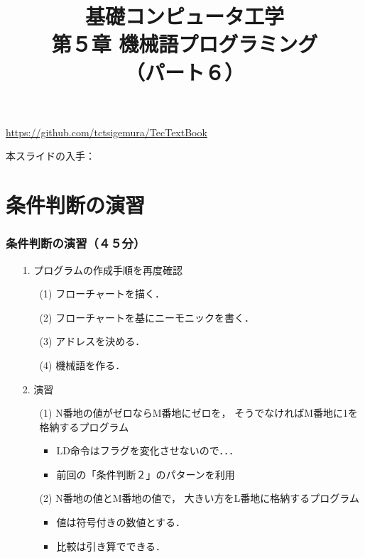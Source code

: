 \documentclass[handout]{beamer}        %
\begin{document}
\title{基礎コンピュータ工学\\第５章 機械語プログラミング\\（パート６）}
\date{}

\begin{frame}
  \titlepage
  \centerline{\url{https://github.com/tctsigemura/TecTextBook}}
  \vfill
  \centerline{本スライドの入手：
    }
\end{frame}


\section{条件判断の演習}
\begin{frame}
  \frametitle{条件判断の演習（４５分）}
  \begin{enumerate}
  \item[1.] プログラムの作成手順を再度確認
    \begin{enumerate}
    \item[(1)] フローチャートを描く．
    \item[(2)] フローチャートを基にニーモニックを書く．
    \item[(3)] アドレスを決める．
    \item[(4)] 機械語を作る．
    \end{enumerate}
    \vfill
  \item[2.] 演習
    \begin{enumerate}
    \item[(1)] N番地の値がゼロならM番地にゼロを，
      そうでなければM番地に1を格納するプログラム
      \begin{itemize}
      \item LD命令はフラグを変化させないので．．．
      \item 前回の「条件判断２」のパターンを利用
      \end{itemize}
      \vfill
    \item[(2)] N番地の値とM番地の値で，
      大きい方をL番地に格納するプログラム
      \begin{itemize}
      \item 値は符号付きの数値とする．
      \item 比較は引き算でできる．
      \end{itemize}
    \end{enumerate}
  \end{enumerate}
  \vfill
\end{frame}
\end{document}

